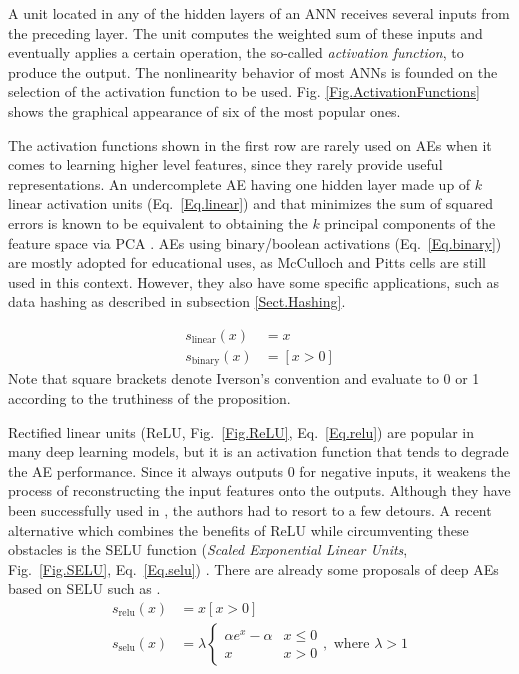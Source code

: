 A unit located in any of the hidden layers of an ANN receives several inputs from the preceding layer. The unit computes the weighted sum of these inputs and eventually applies a certain operation, the so-called \textit{activation function}, to produce the output. The nonlinearity behavior of most ANNs is founded on the selection of the activation function to be used. Fig. \ref{Fig.ActivationFunctions} shows the graphical appearance of six of the most popular ones.


The activation functions shown in the first row are rarely used on AEs when it comes to learning higher level features, since they rarely provide useful representations. An undercomplete AE having one hidden layer made up of $k$ linear activation units (Eq.~\ref{Eq.linear}) and that minimizes the sum of squared errors is known to be equivalent to obtaining the $k$ principal components of the feature space via PCA \cite{ANNsPCA2,ANNsPCA,AutoencoderScoring}. AEs using binary/boolean activations (Eq.~\ref{Eq.binary}) \cite{deng_binary_2010,baldi_autoencoders_2012} are mostly adopted for educational uses, as McCulloch and Pitts \cite{McCullochPitts} cells are still used in this context. However, they also have some specific applications, such as data hashing as described in subsection \ref{Sect.Hashing}.

\begin{align}
  \label{Eq.linear} s_{\mathrm{linear}}(x) &= x \\
  \label{Eq.binary} s_{\mathrm{binary}}(x) &= [x > 0]
\end{align}
Note that square brackets denote Iverson's convention \cite{KnuthNotation} and evaluate to 0 or 1 according to the truthiness of the proposition. 

Rectified linear units (ReLU, Fig.~\ref{Fig.ReLU}, Eq.~\ref{Eq.relu}) are popular in many deep learning models, but it is an activation function that tends to degrade the AE performance. Since it always outputs 0 for negative inputs, it weakens the process of reconstructing the input features onto the outputs. Although they have been successfully used in \cite{RELUinAEs,RELUinAEs2}, the authors had to resort to a few detours. A recent alternative which combines the benefits of ReLU while circumventing these obstacles is the SELU function (\textit{Scaled Exponential Linear Units}, Fig.~\ref{Fig.SELU}, Eq.~\ref{Eq.selu}) \cite{SELU}. There are already some proposals of deep AEs based on SELU such as \cite{DeepAEwSELU}.
\begin{align}
  \label{Eq.relu} s_{\mathrm{relu}}(x) &= x[x > 0] \\
  \label{Eq.selu} s_{\mathrm{selu}}(x) &= \lambda \begin{cases} \alpha e^x-\alpha & x \leq 0 \\ x & x > 0 \end{cases},\text{ where }\lambda>1
\end{align}

